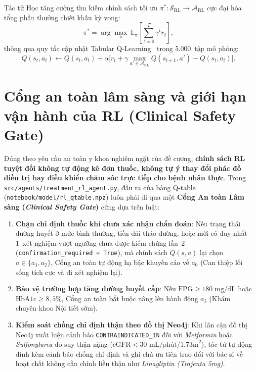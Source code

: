 Tác tử Học tăng cường tìm kiếm chính sách tối ưu $\pi^* : \mathcal{S}_{\text{RL}} \to \mathcal{A}_{\text{RL}}$ cực đại hóa tổng phần thưởng chiết khấu kỳ vọng:
\begin{equation}
  \pi^* = \arg\max_{\pi}\, \mathbb{E}_{\pi}\!\left[\sum_{t=0}^{T} \gamma^t r_t\right],
  \label{eq:optimal-policy}
\end{equation}
thông qua quy tắc cập nhật Tabular Q-Learning~\cite{watkins1992} trong 5.000~tập mô phỏng:
\begin{equation}
  Q(s_t, a_t) \leftarrow Q(s_t, a_t) + \alpha \Big[r_t + \gamma \max_{a' \in \mathcal{A}_{\text{RL}}} Q(s_{t+1}, a') - Q(s_t, a_t)\Big].
  \label{eq:q-learning-update}
\end{equation}

\section{Cổng an toàn lâm sàng và giới hạn vận hành của RL (Clinical Safety Gate)}
\label{sec:rl-safety-gate}

Đúng theo yêu cầu an toàn y khoa nghiêm ngặt của đề cương, \textbf{chính sách RL tuyệt đối không tự động kê đơn thuốc, không tự ý thay đổi phác đồ điều trị hay điều khiển chăm sóc trực tiếp cho bệnh nhân thực}. Trong \texttt{src/agents/treatment\_rl\_agent.py}, đầu ra của bảng Q-table (\texttt{notebook/model/rl\_qtable.npz}) luôn phải đi qua một \textbf{Cổng An toàn Lâm sàng (\emph{Clinical Safety Gate})} cứng dựa trên luật:
\begin{enumerate}
  \item \textbf{Chặn chỉ định thuốc khi chưa xác nhận chẩn đoán}: Nếu trạng thái đường huyết ở mức bình thường, tiền đái tháo đường, hoặc mới có duy nhất 1~xét nghiệm vượt ngưỡng chưa được kiểm chứng lần~2 (\texttt{confirmation\_required = True}), mà chính sách $Q(s,a)$ lại chọn $a \in \{a_1, a_2\}$, Cổng an toàn tự động hạ bậc khuyến cáo về $a_0$ (Can thiệp lối sống tích cực và đi xét nghiệm lại).
  \item \textbf{Bảo vệ trường hợp tăng đường huyết cấp}: Nếu $\text{FPG} \ge 180\text{ mg/dL}$ hoặc $\text{HbA1c} \ge 8{,}5\%$, Cổng an toàn bắt buộc nâng lên hành động $a_3$ (Khám chuyên khoa Nội tiết sớm).
  \item \textbf{Kiểm soát chống chỉ định thận theo đồ thị Neo4j}: Khi lân cận đồ thị Neo4j xuất hiện cảnh báo \texttt{CONTRAINDICATED\_IN} đối với \emph{Metformin} hoặc \emph{Sulfonylurea} do suy thận nặng ($\text{eGFR} < 30\text{ mL/phút/1{,}73m}^2$), tác tử tự động đính kèm cảnh báo chống chỉ định và ghi chú ưu tiên trao đổi với bác sĩ về hoạt chất không cần chỉnh liều thận như \emph{Linagliptin (Trajenta 5mg)}.
\end{enumerate}


